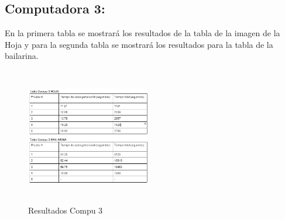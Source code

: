\documentclass[conference]{IEEEtran}
\begin{document}
 \subsection{Computadora 3:}
En la primera tabla se mostrará los resultados de la tabla de la imagen de la Hoja y para la segunda tabla se mostrará los resultados para la tabla de la bailarina. 


\begin{figure}[h]
    \centering
    \includegraphics[width=0.480\textwidth, height=6cm]{tabla compu 3.png} 
    \caption{Resultados Compu 3}
    \label{fig:mi_imagen}
\end{figure}
\end{document}
